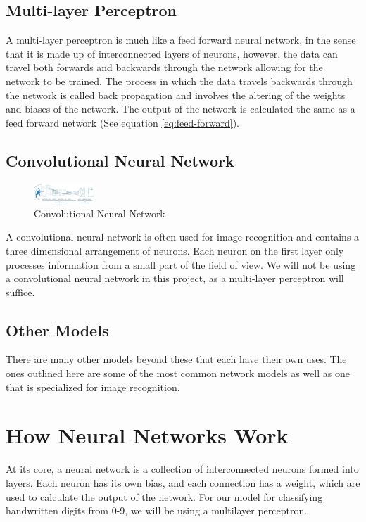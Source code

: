 \documentclass[a1,portrait]{a1poster}
\begin{document}
\begin{multicols}{2}
\subsection*{Multi-layer Perceptron}
A multi-layer perceptron is much like a feed forward neural network, in the sense that it is made up of interconnected layers of neurons, however, the data can travel both forwards and backwards through the network allowing for the network to be trained. The process in which the data travels backwards through the network is called back propagation and involves the altering of the weights and biases of the network. The output of the network is calculated the same as a feed forward network (See equation \ref{eq:feed-forward}).

\subsection*{Convolutional Neural Network}
\begin{figure}
    \centering
    \includegraphics[width=0.2\textwidth]{assets/convolutional.jpeg}
    \caption{Convolutional Neural Network}
    \label{fig:convolutional}
\end{figure}
A convolutional neural network is often used for image recognition and contains a three dimensional arrangement of neurons. Each neuron on the first layer only processes information from a small part of the field of view. We will not be using a convolutional neural network in this project, as a multi-layer perceptron will suffice.
\subsection*{Other Models}
There are many other models beyond these that each have their own uses. The ones outlined here are some of the most common network models as well as one that is specialized for image recognition.

\section*{How Neural Networks Work}
At its core, a neural network is a collection of interconnected neurons formed into layers. Each neuron has its own bias, and each connection has a weight, which are used to calculate the output of the network. For our model for classifying handwritten digits from 0-9, we will be using a multilayer perceptron.

\end{multicols}
\end{document}

